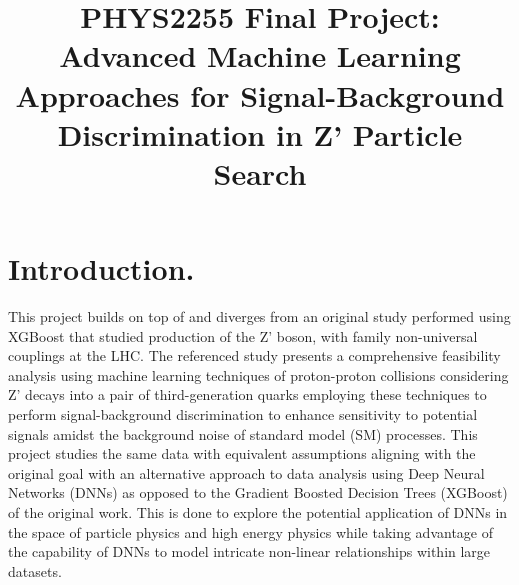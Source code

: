 \documentclass[twocolumn]{webofc}
\begin{document}
%
\title{PHYS2255 Final Project:\\ Advanced Machine Learning Approaches for Signal-Background Discrimination in Z' Particle Search}
%
%

\author{ }



%
\maketitle
%
\section*{Introduction.}\label{sec:readme}
This project builds on top of and diverges from an original study performed using XGBoost that studied production of the Z' boson, with family non-universal couplings at the LHC. The referenced study presents a comprehensive feasibility analysis using machine learning techniques of proton-proton collisions considering Z' decays into a pair of third-generation quarks employing these techniques to perform signal-background discrimination to enhance sensitivity to potential signals amidst the background noise of standard model (SM) processes. This project studies the same data with equivalent assumptions aligning with the original goal with an alternative approach to data analysis using Deep Neural Networks (DNNs) as opposed to the Gradient Boosted Decision Trees (XGBoost) of the original work.\cite{Barbosa_2022} This is done to explore the potential application of DNNs in the space of particle physics and high energy physics while taking advantage of the capability of DNNs to model intricate non-linear relationships within large datasets.\\
\end{document}
